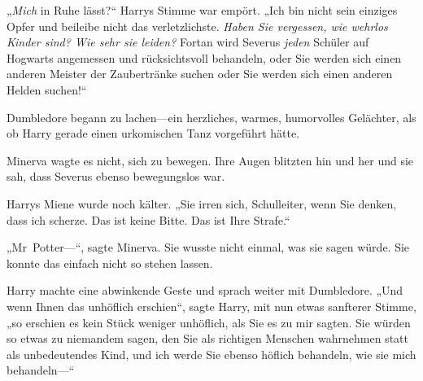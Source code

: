 „\emph{Mich} in Ruhe lässt?“ Harrys Stimme war empört. „Ich bin nicht sein einziges Opfer und beileibe nicht das verletzlichste. \emph{Haben Sie vergessen, wie wehrlos Kinder sind? Wie sehr sie leiden?} Fortan wird Severus \emph{jeden} Schüler auf Hogwarts angemessen und rücksichtsvoll behandeln, oder Sie werden sich einen anderen Meister der Zaubertränke suchen oder Sie werden sich einen anderen Helden suchen!“

Dumbledore begann zu lachen—ein herzliches, warmes, humorvolles Gelächter, als ob Harry gerade einen urkomischen Tanz vorgeführt hätte.

Minerva wagte es nicht, sich zu bewegen. Ihre Augen blitzten hin und her und sie sah, dass Severus ebenso bewegungslos war.

Harrys Miene wurde noch kälter. „Sie irren sich, Schulleiter, wenn Sie denken, dass ich scherze. Das ist keine Bitte. Das ist Ihre Strafe.“

„Mr~Potter—“, sagte Minerva. Sie wusste nicht einmal, was sie sagen würde. Sie konnte das einfach nicht so stehen lassen.

Harry machte eine abwinkende Geste und sprach weiter mit Dumbledore. „Und wenn Ihnen das unhöflich erschien“, sagte Harry, mit nun etwas sanfterer Stimme, „so erschien es kein Stück weniger unhöflich, als Sie es zu mir sagten. Sie würden so etwas zu niemandem sagen, den Sie als richtigen Menschen wahrnehmen statt als unbedeutendes Kind, und ich werde Sie ebenso höflich behandeln, wie sie mich behandeln—“

